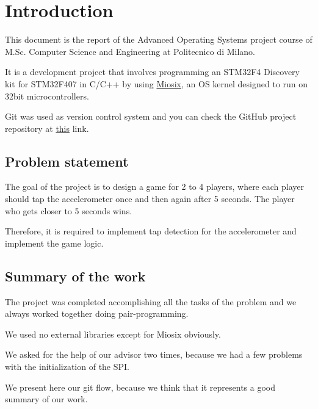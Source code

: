 \section{Introduction}
This document is the report of the Advanced Operating Systems project course of M.Sc. Computer Science and Engineering at Politecnico di Milano.

It is a development project that involves programming an STM32F4 Discovery kit
for STM32F407 in C/C++ by using \href{http://miosix.org/}{Miosix}, an OS kernel designed to run on 32bit microcontrollers.

Git was used as version control system and you can check the GitHub project repository
at \href{https://github.com/MarcoIeni/accelerometer_game}{this} link.
\subsection{Problem statement}
The goal of the project is to design a game for 2 to 4 players, where each player should tap the accelerometer once and then again after 5 seconds. The player who gets closer to 5 seconds wins.

Therefore, it is required to implement tap detection for the accelerometer and implement the game logic.
\subsection{Summary of the work}
The project was completed accomplishing all the tasks of the problem and we
always worked together doing pair-programming.

We used no external libraries except for Miosix obviously.

We asked for the help of our advisor two times, because we had a few
problems with the initialization of the SPI.

We present here our git flow, because we think that it represents a good summary
of our work.

